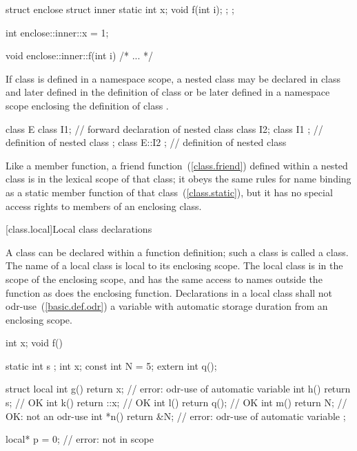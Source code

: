 \begin{codeblock}
struct enclose {
  struct inner {
    static int x;
    void f(int i);
  };
};

int enclose::inner::x = 1;

void enclose::inner::f(int i) { /* ... */ }
\end{codeblock}
\exitexample

\pnum
If class  is defined in a namespace scope, a nested class
 may be declared in class  and later defined in the
definition of class  or be later defined in a namespace scope
enclosing the definition of class .
%
\enterexample

\begin{codeblock}
class E {
  class I1;                     // forward declaration of nested class
  class I2;
  class I1 { };                 // definition of nested class
};
class E::I2 { };                // definition of nested class
\end{codeblock}
\exitexample

\pnum
{}%
Like a member function, a friend function~(\ref{class.friend}) defined
within a nested class is in the lexical scope of that class; it obeys
the same rules for name binding as a static member function of that
class~(\ref{class.static}), but it has no special access rights to
members of an enclosing class.

[class.local]{Local class declarations}
%
%

\pnum
A class can be declared within a function definition; such a class is
called a  class. The name of a local class is local to
its enclosing scope.
%
The local class is in the scope of the enclosing scope, and has the same
access to names outside the function as does the enclosing function.
Declarations in a local class
shall not odr-use~(\ref{basic.def.odr}) a variable with automatic storage
duration from an
enclosing scope.
\enterexample
{}%
\begin{codeblock}
int x;
void f() {
  static int s ;
  int x;
  const int N = 5;
  extern int q();

  struct local {
    int g() { return x; }       // error: odr-use of automatic variable 
    int h() { return s; }       // OK
    int k() { return ::x; }     // OK
    int l() { return q(); }     // OK
    int m() { return N; }       // OK: not an odr-use
    int *n() { return &N; }     // error: odr-use of automatic variable 
  };
}

local* p = 0;                   // error:  not in scope
\end{codeblock}
\exitexample

